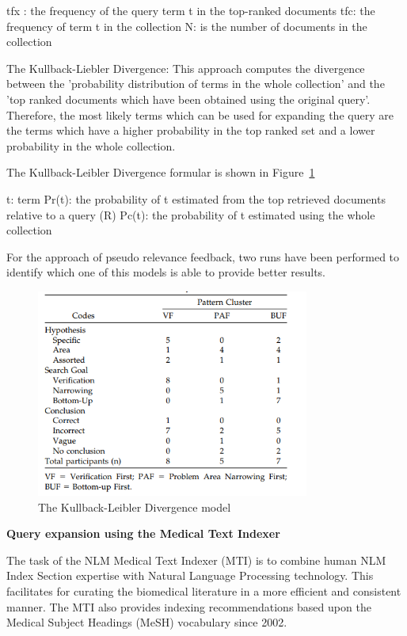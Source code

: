 \documentclass[]{article}
\begin{document}
tfx : the frequency of the query term t in the top-ranked documents
tfc: the frequency of term t in the collection
N: is the number of documents in the collection

The Kullback-Liebler Divergence: This approach computes the divergence between the 'probability distribution of terms in the whole collection' and the 'top ranked documents which have been obtained using the original query'. Therefore, the most likely terms which can be used for expanding the query are the terms which have a higher probability in the top ranked set and a lower probability in the whole collection. 

The Kullback-Leibler Divergence formular is shown in Figure~\ref{fig10}

t: term
Pr(t): the probability of t estimated from the top retrieved documents relative to a query (R)
Pc(t): the probability of t estimated using the whole collection
 
For the approach of pseudo relevance feedback, two runs have been performed to identify which one of this models
is able to provide better results.   

\begin{figure}[t!]
	\includegraphics[width=0.8\textwidth]{Capture10.png}
	\caption{The Kullback-Leibler Divergence model \label{fig10}}
\end{figure}

\textbf{Query expansion using the Medical Text Indexer}

The task of the NLM Medical Text Indexer (MTI) is to combine human NLM Index Section expertise with Natural Language Processing technology. This facilitates for curating the biomedical literature in a more efficient and consistent manner. The MTI also provides indexing recommendations based upon the Medical Subject Headings (MeSH) vocabulary since 2002.    
\end{document}
